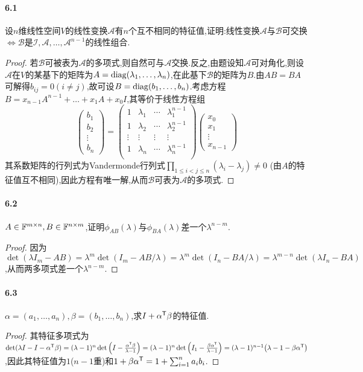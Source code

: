 \documentclass[11pt]{article}
\begin{document}
\paragraph{6.1}设$n$维线性空间$V$的线性变换$\mathscr{A}$有$n$个互不相同的特征值,证明:线性变换$\mathscr{A}$与$\mathscr{B}$可交换$\iff \mathscr{B}$是$\mathscr{I, A},\dots,\mathscr{A}^{n-1}$的线性组合.
\begin{proof}
    若$\mathscr{B}$可被表为$\mathscr{A}$的多项式,则自然可与$\mathscr{A}$交换.反之,由题设知$\mathscr{A}$可对角化,则设$\mathscr{A}$在$V$的某基下的矩阵为$A=\operatorname{diag}(\lambda_1,\dots,\lambda_n)$,在此基下$\mathscr{B}$的矩阵为$B$.由$AB=BA$可解得$b_{ij}=0 (i\neq j)$,故可设$B=\operatorname{diag}(b_1,\dots,b_n)$.考虑方程$B=x_{n-1}A^{n-1}+\dots+x_1A+x_0I$,其等价于线性方程组
    $$\begin{pmatrix}
        b_1\\ b_2 \\ \vdots \\ b_n
    \end{pmatrix}=\begin{pmatrix}
        1 & \lambda_1 & \cdots & \lambda_1^{n-1}\\
        1 & \lambda_2 & \cdots & \lambda_2^{n-1}\\
        \vdots & \vdots & \vdots & \vdots\\
        1 & \lambda_n & \cdots & \lambda_n^{n-1}\\
    \end{pmatrix}\begin{pmatrix}
        x_0\\ x_1 \\ \vdots \\ x_{n-1}
    \end{pmatrix}$$
    其系数矩阵的行列式为Vandermonde行列式$\prod_{1\leq i<j\leq n}(\lambda_i-\lambda_j)\neq 0$ (由$A$的特征值互不相同),因此方程有唯一解,从而$\mathscr{B}$可表为$\mathscr{A}$的多项式.
\end{proof}
\paragraph{6.2}$A\in \mathbb{F}^{m\times n}, B\in \mathbb{F}^{n\times m}$,证明$\phi_{AB}(\lambda)$与$\phi_{BA}(\lambda)$差一个$\lambda^{n-m}$.
\begin{proof}
    因为$\det(\lambda I_m -AB)=\lambda^m \det(I_m-AB/\lambda)=\lambda^m\det(I_n-BA/\lambda)=\lambda^{m-n}\det(\lambda I_n-BA)$,从而两多项式差一个$\lambda^{n-m}$.
\end{proof}
\paragraph{6.3}$\alpha=(a_1,\dots,a_n),\beta=(b_1,\dots,b_n)$,求$I+\alpha^{\mathsf{T}}\beta$的特征值.
\begin{proof}
    其特征多项式为$\det(\lambda I-I-\alpha^{\mathsf{T}}\beta)=(\lambda-1)^n \det\left(I-\frac{\alpha^{\mathsf{T}}\beta}{\lambda-1}\right)=(\lambda-1)^n \det\left(I_1-\frac{\beta\alpha^{\mathsf{T}}}{\lambda-1}\right)=(\lambda-1)^{n-1}\!\left(\lambda-1-\beta\alpha^{\mathsf{T}}\right)$,因此其特征值为$1$($n-1$重)和$1+\beta\alpha^{\mathsf{T}}=1+\sum_{i=1}^n a_ib_i$.
\end{proof}
\end{document}
